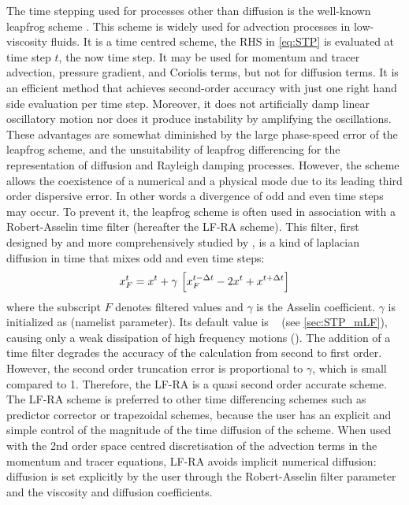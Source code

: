 \documentclass[../main/NEMO_manual]{subfiles}
\begin{document}
The time stepping used for processes other than diffusion is the well-known leapfrog scheme
\citep{Mesinger_Arakawa_Bk76}.
This scheme is widely used for advection processes in low-viscosity fluids.
It is a time centred scheme, \ie the RHS in \autoref{eq:STP} is evaluated at time step $t$, the now time step.
It may be used for momentum and tracer advection, pressure gradient, and Coriolis terms,
but not for diffusion terms.
It is an efficient method that achieves second-order accuracy with
just one right hand side evaluation per time step.
Moreover, it does not artificially damp linear oscillatory motion nor does it produce instability by
amplifying the oscillations.
These advantages are somewhat diminished by the large phase-speed error of the leapfrog scheme,
and the unsuitability of leapfrog differencing for the representation of diffusion and Rayleigh damping processes.
However, the scheme allows the coexistence of a numerical and a physical mode due to
its leading third order dispersive error.
In other words a divergence of odd and even time steps may occur.
To prevent it, the leapfrog scheme is often used in association with a Robert-Asselin time filter
(hereafter the LF-RA scheme).
This filter, first designed by \citet{Robert_JMSJ66} and more comprehensively studied by \citet{Asselin_MWR72},
is a kind of laplacian diffusion in time that mixes odd and even time steps:
\begin{equation}
  \label{eq:STP_asselin}
  x_F^t = x^t + \gamma \, \left[ x_F^{t - \Delta t} - 2 x^t + x^{t + \Delta t} \right]
\end{equation}
where the subscript $F$ denotes filtered values and $\gamma$ is the Asselin coefficient.
$\gamma$ is initialized as  (namelist parameter).
Its default value is ~ (see \autoref{sec:STP_mLF}),
causing only a weak dissipation of high frequency motions (\citep{Farge1987}).
The addition of a time filter degrades the accuracy of the calculation from second to first order.
However, the second order truncation error is proportional to $\gamma$, which is small compared to 1.
Therefore, the LF-RA is a quasi second order accurate scheme.
The LF-RA scheme is preferred to other time differencing schemes such as predictor corrector or trapezoidal schemes,
because the user has an explicit and simple control of the magnitude of the time diffusion of the scheme.
When used with the 2nd order space centred discretisation of the advection terms in
the momentum and tracer equations, LF-RA avoids implicit numerical diffusion:
diffusion is set explicitly by the user through the Robert-Asselin 
filter parameter and the viscosity and diffusion coefficients.
\end{document}
